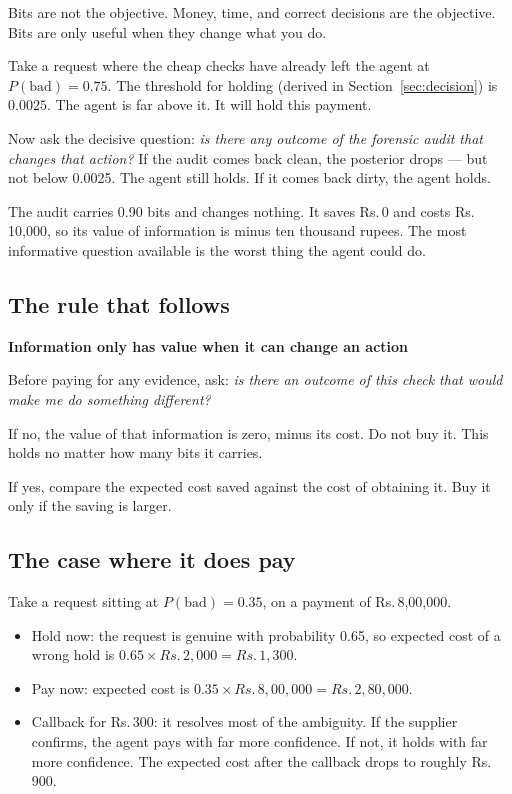 \documentclass[11pt,a4paper]{article}
\newcommand{\rs}{Rs.\,}
\newcommand{\boxtitle}[1]{{\bfseries #1}\par\vspace{2pt}}
\begin{document}
Bits are not the objective. Money, time, and correct decisions are the objective. Bits are only
useful when they change what you do.

Take a request where the cheap checks have already left the agent at $P(\text{bad}) = 0.75$. The
threshold for holding (derived in Section~\ref{sec:decision}) is $0.0025$. The agent is far
above it. It will hold this payment.

Now ask the decisive question: \emph{is there any outcome of the forensic audit that changes that
action?} If the audit comes back clean, the posterior drops --- but not below 0.0025. The agent
still holds. If it comes back dirty, the agent holds.

The audit carries 0.90 bits and changes nothing. It saves \rs 0 and costs \rs 10{,}000, so its
value of information is minus ten thousand rupees. The most informative question available is
the worst thing the agent could do.

\subsection{The rule that follows}

\begin{sbbox}
\boxtitle{Information only has value when it can change an action}
Before paying for any evidence, ask: \emph{is there an outcome of this check that would make me do
something different?}

If no, the value of that information is zero, minus its cost. Do not buy it. This holds no matter
how many bits it carries.

If yes, compare the expected cost saved against the cost of obtaining it. Buy it only if the
saving is larger.
\end{sbbox}

\subsection{The case where it does pay}

Take a request sitting at $P(\text{bad}) = 0.35$, on a payment of \rs 8{,}00{,}000.

\begin{itemize}
  \item Hold now: the request is genuine with probability 0.65, so expected cost of a wrong hold
        is $0.65 \times \rs 2{,}000 = \rs 1{,}300$.
  \item Pay now: expected cost is $0.35 \times \rs 8{,}00{,}000 = \rs 2{,}80{,}000$.
  \item Callback for \rs 300: it resolves most of the ambiguity. If the supplier confirms, the
        agent pays with far more confidence. If not, it holds with far more confidence. The
        expected cost after the callback drops to roughly \rs 900.
\end{itemize}
\end{document}
